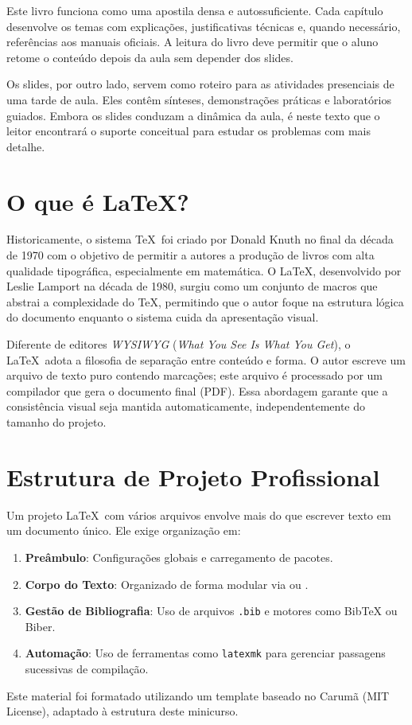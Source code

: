 Este livro funciona como uma apostila densa e autossuficiente. Cada capítulo desenvolve os temas com explicações, justificativas técnicas e, quando necessário, referências aos manuais oficiais. A leitura do livro deve permitir que o aluno retome o conteúdo depois da aula sem depender dos slides.

Os slides, por outro lado, servem como roteiro para as atividades presenciais de uma tarde de aula. Eles contêm sínteses, demonstrações práticas e laboratórios guiados. Embora os slides conduzam a dinâmica da aula, é neste texto que o leitor encontrará o suporte conceitual para estudar os problemas com mais detalhe.

\section{O que é \LaTeX?}

Historicamente, o sistema \TeX\ foi criado por Donald Knuth no final da década de 1970 com o objetivo de permitir a autores a produção de livros com alta qualidade tipográfica, especialmente em matemática. O \LaTeX, desenvolvido por Leslie Lamport na década de 1980, surgiu como um conjunto de macros que abstrai a complexidade do \TeX, permitindo que o autor foque na estrutura lógica do documento enquanto o sistema cuida da apresentação visual.

Diferente de editores \textit{WYSIWYG} (\textit{What You See Is What You Get}), o \LaTeX\ adota a filosofia de separação entre conteúdo e forma. O autor escreve um arquivo de texto puro contendo marcações; este arquivo é processado por um compilador que gera o documento final (PDF). Essa abordagem garante que a consistência visual seja mantida automaticamente, independentemente do tamanho do projeto.

\section{Estrutura de Projeto Profissional}

Um projeto \LaTeX\ com vários arquivos envolve mais do que escrever texto em um documento único. Ele exige organização em:
\begin{enumerate}
    \item \textbf{Preâmbulo}: Configurações globais e carregamento de pacotes.
    \item \textbf{Corpo do Texto}: Organizado de forma modular via \verb|| ou \verb||.
    \item \textbf{Gestão de Bibliografia}: Uso de arquivos \texttt{.bib} e motores como BibTeX ou Biber.
    \item \textbf{Automação}: Uso de ferramentas como \texttt{latexmk} para gerenciar passagens sucessivas de compilação.
\end{enumerate}

Este material foi formatado utilizando um template baseado no Carumã \cite{gomes2021carauma} (MIT License), adaptado à estrutura deste minicurso.
